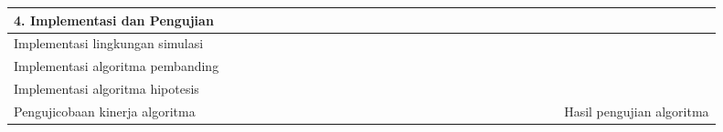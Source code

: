 \begin{landscape}
\begin{table}
\begin{tabularx}{\linewidth}{X *{26}{>{\centering\arraybackslash}m{12pt}}X}
            \multicolumn{28}{l}{4. Implementasi dan Pengujian}                                                                                \\ \midrule
            Implementasi lingkungan simulasi                &   &  &
            \cellcolor[HTML]{333333}                        &
            \cellcolor[HTML]{333333}                        &
            \cellcolor[HTML]{333333}                        &
            \cellcolor[HTML]{333333}{\color[HTML]{333333} } &   &  &   &  &   &  &  &   &   &   &   &   &  &  &   &   &   &   &   &  &        \\ \cmidrule{1-1}
            Implementasi algoritma pembanding               &   &  &   &  &
            \cellcolor[HTML]{333333}                        &
            \cellcolor[HTML]{333333}                        &
            \cellcolor[HTML]{333333}                        &
            \cellcolor[HTML]{333333}                        &
            \cellcolor[HTML]{333333}                        &
            \cellcolor[HTML]{333333}                        &   &  &   &  &   &  &  &   &   &   &   &   &  &  &   &   &                       \\ \cmidrule{1-1}
            Implementasi algoritma hipotesis                &   &  &   &  &   &  &  &
            \cellcolor[HTML]{333333}                        &
            \cellcolor[HTML]{333333}                        &
            \cellcolor[HTML]{333333}                        &
            \cellcolor[HTML]{333333}                        &
            \cellcolor[HTML]{333333}                        &
            \cellcolor[HTML]{333333}                        &
            \cellcolor[HTML]{333333}                        &
            \cellcolor[HTML]{333333}                        &   &  &   &  &   &  &  &   &   &   &   &                                         \\ \cmidrule{1-1}
            Pengujicobaan kinerja algoritma                 &   &  &   &  &   &  &  &   &
            \cellcolor[HTML]{333333}                        &
            \cellcolor[HTML]{333333}                        &
            \cellcolor[HTML]{333333}                        &
            \cellcolor[HTML]{333333}                        &
            \cellcolor[HTML]{333333}                        &
            \cellcolor[HTML]{333333}                        &
            \cellcolor[HTML]{333333}                        &
            \cellcolor[HTML]{333333}                        &   &  &   &  &   &  &  &   &   &   &
            \multirow{-4}{*}{Hasil pengujian algoritma}                                                                                       \\ \midrule


\end{tabularx}
\end{table}
\end{landscape}
